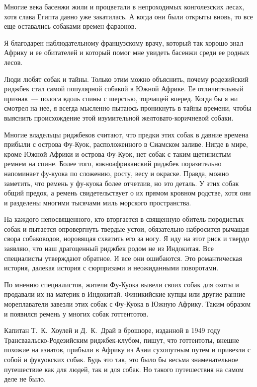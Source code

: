 \documentclass[12pt,a4paper,twoside,openany,svgnames]{memoir}
\begin{document}
Многие века басенжи жили и процветали в непроходимых конголезских лесах, хотя слава Египта давно уже закатилась. А когда они были открыты вновь, то все еще оставались собаками времен фараонов.

Я благодарен наблюдательному французскому врачу, который так хорошо знал Африку и ее обитателей и который помог мне увидеть басенжи среди ее родных лесов.

Люди любят собак и тайны. Только этим можно объяснить, почему родезийский риджбек стал самой популярной собакой в Южной Африке. Ее отличительный признак~--- полоса вдоль спины с шерстью, торчащей вперед. Когда бы я ни смотрел на нее, я всегда мысленно пытаюсь проникнуть в тайны времени, чтобы выяснить происхождение этой изумительной желтовато-коричневой собаки.

Многие владельцы риджбеков считают, что предки этих собак в давние времена прибыли с острова Фу-Куок, расположенного в Сиамском заливе. Нигде в мире, кроме Южной Африки и острова Фу-Куок, нет собак с таким щетинистым ремнем на спине. Более того, южноафриканский риджбек поразительно напоминает фу-куока по сложению, росту, весу и окраске. Правда, можно заметить, что ремень у фу-куока более отчетлив, но это деталь. У этих собак общий предок, а ремень свидетельствует о их прямом кровном родстве, хотя они и разделены многими тысячами миль морского пространства.

На каждого непосвященного, кто вторгается в священную обитель породистых собак и пытается опровергнуть твердые устои, обязательно набросится рычащая свора собаководов, норовящая схватить его за ногу. Я иду на этот риск и твердо заявляю, что наш драгоценный риджбек родом не из Индокитая. Все специалисты утверждают обратное. И все они ошибаются. Это романтическая история, далекая история с сюрпризами и неожиданными поворотами.

По мнению специалистов, жители Фу-Куока вывели своих собак для охоты и продавали их на материк в Индокитай. Финикийские купцы или другие ранние мореплаватели завезли этих собак с Фу-Куока в Южную Африку. Таким образом и появился ремень у многих собак готтентотов.

Капитан Т.~К.~Хоулей и Д.~К.~Драй в брошюре, изданной в 1949 году Трансваальско-Родезийским риджбек-клубом, пишут, что готтентоты, внешне похожие на азиатов, прибыли в Африку из Азии сухопутным путем и привезли с собой и фукуокских собак. Будь это так, это было бы весьма знаменательное путешествие как для людей, так и для собак. Но такого путешествия на самом деле не было.
\end{document}
